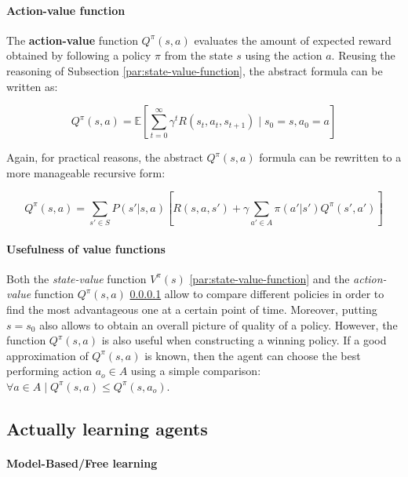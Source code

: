 \paragraph{Action-value function}
\label{par:action-value-function}

The \textbf{action-value} function $Q^{\pi}(s, a)$ evaluates the amount of expected reward obtained by following a policy $\pi$ from the state $s$ using the action $a$.
Reusing the reasoning of Subsection \ref{par:state-value-function}, the abstract formula can be written as:

\begin{equation} \label{eq:Q-pi-E}
Q^\pi(s, a) = \mathbb{E} \left[ \sum_{t=0}^{\infty} \gamma^t R(s_t, a_t, s_{t+1}) \mid s_0 = s, a_0 = a \right]
\end{equation}

Again, for practical reasons, the abstract $Q^{\pi}(s, a)$ formula can be rewritten to a more manageable recursive form:

\begin{equation} \label{eq:Q-pi-bellman}
Q^{\pi}(s, a) = \sum _ {s' \in S} P(s' | s, a) \left[ R(s, a, s') + \gamma \sum _ {a' \in A} \pi (a' | s') Q^{\pi}(s', a') \right]
\end{equation}

\paragraph{Usefulness of value functions}

Both the \textit{state-value} function $V^{\pi}(s)$ \ref{par:state-value-function} and the \textit{action-value} function $Q^{\pi}(s, a)$ \ref{par:action-value-function} allow to compare different policies in order to find the most advantageous one at a certain point of time. Moreover, putting $s = s_0$ also allows to obtain an overall picture of quality of a policy. However, the function $Q^{\pi}(s, a)$ is also useful when constructing a winning policy. If a good approximation of $Q^{\pi}(s, a)$ is known, then the agent can choose the best performing action $a_o \in A$ using a simple comparison: $\forall a \in A \; | \; Q^{\pi}(s, a) \leq Q^{\pi}(s, a_o)$.

\subsection{Actually learning agents}

\paragraph{Model-Based/Free learning}

